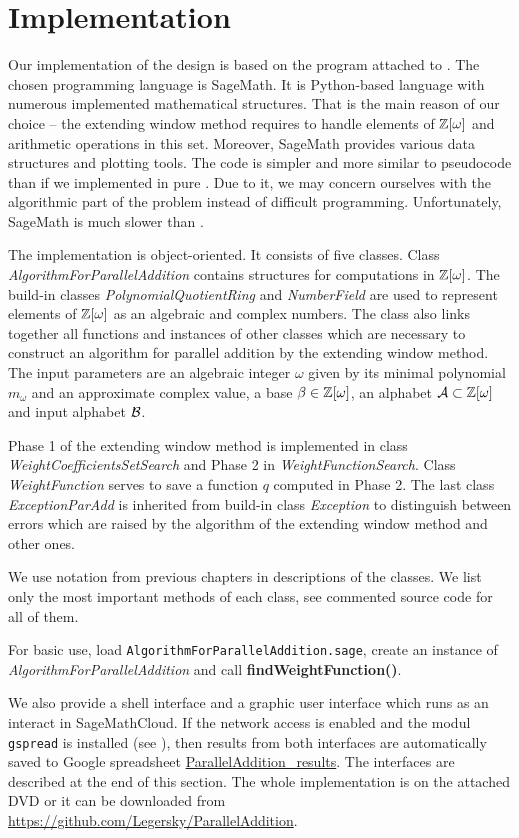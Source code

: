 \section{Implementation}

Our implementation of the design is based on the program attached to \cite{vu}. The chosen programming language is SageMath. It is Python-based language with numerous implemented mathematical structures. That is the main reason of our choice -- the extending window method requires to handle elements of $\mathbb{Z}[\omega]$ and arithmetic operations in this set. Moreover, SageMath provides various data structures and plotting tools.  The code is simpler and more similar to pseudocode than if we implemented in pure \Cpp. Due to it, we may concern ourselves with the algorithmic part of the problem instead of difficult programming. Unfortunately, SageMath is much slower than \Cpp.


The implementation is object-oriented. It consists of five classes. Class \emph{AlgorithmForParallelAddition} contains structures for computations in $\mathbb{Z}[\omega]$. The build-in classes \emph{PolynomialQuotientRing} and \emph{NumberField} are used to represent elements of $\mathbb{Z}[\omega]$ as an algebraic and complex numbers. The class also links together all functions and instances of other classes which are necessary to construct an algorithm for parallel addition by the extending window method. The input parameters are an algebraic integer $\omega$ given by its minimal polynomial $m_\omega$ and an approximate complex value, a base $\beta\in\mathbb{Z}[\omega]$, an alphabet $\mathcal{A}\subset\mathbb{Z}[\omega]$ and input alphabet $\mathcal{B}$. 

Phase 1 of the extending window method is implemented in class \emph{WeightCoefficientsSetSearch} and Phase 2 in \emph{WeightFunctionSearch}. Class \emph{WeightFunction} serves to save a function $q$ computed in Phase 2. The last class \emph{ExceptionParAdd} is inherited from build-in class \emph{Exception} to distinguish between errors which are raised by the algorithm  of the extending window method and other ones.

We use notation from previous chapters in descriptions of the classes. We list only the most important methods of each class, see commented source code for all of them.  

For basic use, load \verb+AlgorithmForParallelAddition.sage+, create an instance of \emph{AlgorithmForParallelAddition} and call \textbf{findWeightFunction()}.

We also provide a shell interface and a graphic user interface which runs as an interact in SageMathCloud. If the network access is enabled and the modul \verb+gspread+ is installed (see \cite{gspread}), then results from both interfaces are automatically saved to Google spreadsheet \href{https://docs.google.com/spreadsheets/d/1TnhrHdefHfHa0WSeVs4q6XVj3epjPlPlnoekE0E1xeM/edit?usp=sharing}{ParallelAddition\_results}. The interfaces are described at the end of this section. The whole implementation is on the attached DVD or it can be downloaded from  \url{https://github.com/Legersky/ParallelAddition}.



